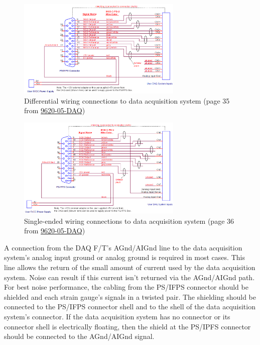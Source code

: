 \documentclass[a4paper]{article}
\begin{document}
\begin{figure}[h!]
	\centering
	\includegraphics[width=0.7\textwidth]{diff_wiring.png}
	\caption{Differential wiring connections to data acquisition system (page 35 from \hyperref{https://www.ati-ia.com/app_content/documents/9620-05-DAQ.pdf}{category}{name}{9620-05-DAQ})}
	\label{fig:diff_wiring}
\end{figure}

\begin{figure}[h!]
	\centering
	\includegraphics[width=0.7\textwidth]{se_wiring.png}
	\caption{Single-ended wiring connections to data acquisition system (page 36 from \hyperref{https://www.ati-ia.com/app_content/documents/9620-05-DAQ.pdf}{category}{name}{9620-05-DAQ})}
	\label{fig:se_wiring}
\end{figure}

A connection from the DAQ F/T's AGnd/AIGnd line to the data acquisition system’s analog input ground or analog ground is required in most cases.
This line allows the return of the small amount of current used by the data acquisition system. Noise can result if this current isn't returned via the AGnd/AIGnd path.
For best noise performance, the cabling from the PS/IFPS connector should be shielded and each strain gauge's signals in a twisted pair. The shielding should be connected to the PS/IFPS connector shell and to the shell of the data acquisition system’s connector. If the data acquisition system has no connector or its connector shell is electrically floating, then the shield at the PS/IPFS connector should be connected to the AGnd/AIGnd signal.
\end{document}

